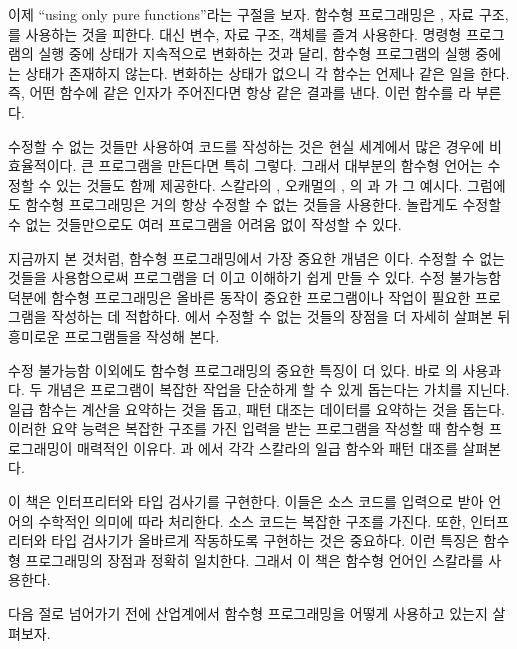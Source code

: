 이제 ``using only pure functions''라는 구절을 보자. 함수형 프로그래밍은
 , 자료 구조,
를 사용하는 것을 피한다.
대신  변수, 자료 구조, 객체를 즐겨 사용한다. 명령형
프로그램의 실행 중에 상태가 지속적으로 변화하는 것과 달리, 함수형 프로그램의
실행 중에는 상태가 존재하지 않는다. 변화하는 상태가 없으니 각 함수는 언제나 같은
일을 한다. 즉, 어떤 함수에 같은 인자가 주어진다면 항상 같은 결과를 낸다. 이런
함수를 라 부른다.

수정할 수 없는 것들만 사용하여 코드를 작성하는 것은 현실 세계에서 많은 경우에
비효율적이다. 큰 프로그램을 만든다면 특히 그렇다. 그래서 대부분의 함수형 언어는
수정할 수 있는 것들도 함께 제공한다. 스칼라의 , 오캐멀의 ,
의
과 가 그 예시다. 그럼에도 함수형 프로그래밍은 거의 항상 수정할 수 없는
것들을 사용한다. 놀랍게도 수정할 수 없는 것들만으로도 여러 프로그램을 어려움 없이
작성할 수 있다.

지금까지 본 것처럼, 함수형 프로그래밍에서 가장 중요한 개념은 이다.
수정할 수 없는 것들을 사용함으로써 프로그램을 더 이고
이해하기 쉽게 만들 수 있다. 수정 불가능함 덕분에 함수형 프로그래밍은 올바른
동작이 중요한 프로그램이나  작업이 필요한 프로그램을 작성하는 데
적합하다. 에서 수정할 수 없는 것들의 장점을 더 자세히 살펴본 뒤 흥미로운
프로그램들을 작성해 본다.

수정 불가능함 이외에도 함수형 프로그래밍의 중요한 특징이 더 있다. 바로
의 사용과 다. 두 개념은
프로그램이 복잡한 작업을 단순하게 할 수 있게 돕는다는 가치를
지닌다. 일급 함수는 계산을 요약하는 것을 돕고, 패턴 대조는 데이터를 요약하는
것을 돕는다. 이러한 요약 능력은 복잡한 구조를 가진 입력을 받는 프로그램을 작성할
때 함수형 프로그래밍이 매력적인 이유다. 과 에서 각각 스칼라의 일급 함수와
패턴 대조를 살펴본다.

이 책은 인터프리터와 타입 검사기를 구현한다. 이들은 소스 코드를 입력으로 받아
언어의 수학적인 의미에 따라 처리한다. 소스 코드는 복잡한 구조를 가진다. 또한,
인터프리터와 타입 검사기가 올바르게 작동하도록 구현하는 것은 중요하다. 이런
특징은 함수형 프로그래밍의 장점과 정확히 일치한다. 그래서 이 책은 함수형
언어인 스칼라를 사용한다.

다음 절로 넘어가기 전에 산업계에서 함수형 프로그래밍을 어떻게 사용하고 있는지
살펴보자.

